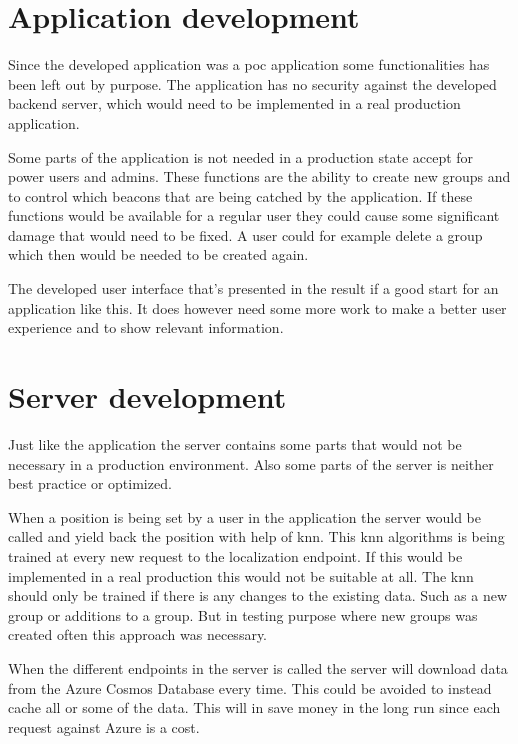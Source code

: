 \section{Application development}\label{sec:}
Since the developed application was a \acrshort{poc} application some functionalities has been left out by purpose.
The application has no security against the developed backend server, which would need to be implemented in a real production application.

\bigskip

Some parts of the application is not needed in a production state accept for power users and admins.
These functions are the ability to create new groups and to control which beacons that are being catched by the application.
If these functions would be available for a regular user they could cause some significant damage that would need to be fixed.
A user could for example delete a group which then would be needed to be created again.

\bigskip

The developed user interface that's presented in the result if a good start for an application like this.
It does however need some more work to make a better user experience and to show relevant information.


\section{Server development}\label{sec:}
Just like the application the server contains some parts that would not be necessary in a production environment.
Also some parts of the server is neither best practice or optimized.

\bigskip

When a position is being set by a user in the application the server would be called and yield back the position with help of \acrlong{knn}.
This \acrshort{knn} algorithms is being trained at every new request to the localization endpoint.
If this would be implemented in a real production this would not be suitable at all.
The \acrshort{knn} should only be trained if there is any changes to the existing data.
Such as a new group or additions to a group.
But in testing purpose where new groups was created often this approach was necessary.

\bigskip

When the different endpoints in the server is called the server will download data from the Azure Cosmos Database every time. 
This could be avoided to instead cache all or some of the data.
This will in save money in the long run since each request against Azure is a cost.


